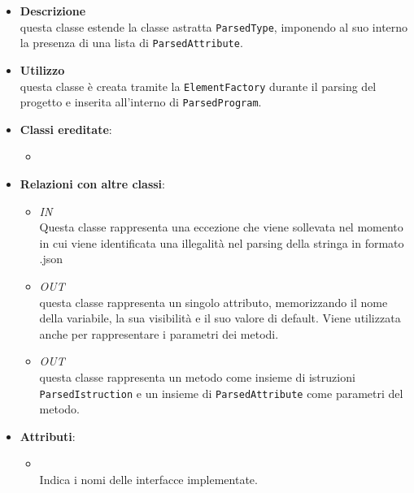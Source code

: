 \begin{itemize}
\item \textbf{Descrizione}\\
questa classe estende la classe astratta \texttt{ParsedType}, imponendo al suo interno la presenza di una lista di \texttt{ParsedAttribute}. 
\item \textbf{Utilizzo}\\
questa classe è creata tramite la \texttt{ElementFactory} durante il parsing del progetto e inserita all'interno di \texttt{ParsedProgram}.
\item \textbf{Classi ereditate}:
\begin{itemize}
\item \hyperref[\nogloxy{swedesigner::server::project::ParsedType}]{}
\end{itemize}
\item \textbf{Relazioni con altre classi}:
\begin{itemize}
\item \textit{IN} \hyperref[\nogloxy{swedesigner::server::project::ParsedException}]{}\\
Questa classe rappresenta una eccezione che viene sollevata nel momento in cui viene identificata una illegalità nel parsing della stringa in formato .json
\item \textit{OUT} \hyperref[\nogloxy{swedesigner::server::project::ParsedAttribute}]{}\\
questa classe rappresenta un singolo attributo, memorizzando il nome della variabile, la sua visibilità e il suo valore di default. Viene utilizzata anche per rappresentare i parametri dei metodi.
\item \textit{OUT} \hyperref[\nogloxy{swedesigner::server::project::ParsedMethod}]{}\\
questa classe rappresenta un metodo come insieme di istruzioni \texttt{ParsedIstruction} e un insieme di \texttt{ParsedAttribute} come parametri del metodo.
\end{itemize}
\item \textbf{Attributi}:
\begin{itemize}
\item {}
\\ Indica i nomi delle interfacce implementate.

\end{itemize}
\end{itemize}
